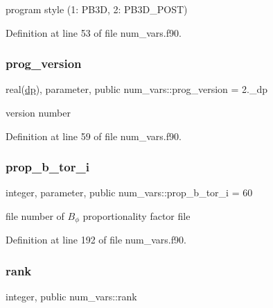 program style (1\+: P\+B3D, 2\+: P\+B3\+D\+\_\+\+P\+O\+ST) 



Definition at line 53 of file num\+\_\+vars.\+f90.

\mbox{\label{namespacenum__vars_a7ab03bffd054a230cad4b7e2c130def1}} 
\subsubsection{\texorpdfstring{prog\+\_\+version}{prog\_version}}
{\footnotesize\ttfamily real(\hyperlink{namespacenum__vars_a03802aa2bd86439d7a9370836fabf3f2}{dp}), parameter, public num\+\_\+vars\+::prog\+\_\+version = 2.\+\_\+dp}



version number 



Definition at line 59 of file num\+\_\+vars.\+f90.

\mbox{\label{namespacenum__vars_ad4a441f0ea4a8b93fd373a6c96c918e0}} 
\subsubsection{\texorpdfstring{prop\+\_\+b\+\_\+tor\+\_\+i}{prop\_b\_tor\_i}}
{\footnotesize\ttfamily integer, parameter, public num\+\_\+vars\+::prop\+\_\+b\+\_\+tor\+\_\+i = 60}



file number of $B_\phi$ proportionality factor file 



Definition at line 192 of file num\+\_\+vars.\+f90.

\mbox{\label{namespacenum__vars_ab47aa91445feaedb05ac9d1a584664fe}} 
\subsubsection{\texorpdfstring{rank}{rank}}
{\footnotesize\ttfamily integer, public num\+\_\+vars\+::rank}



